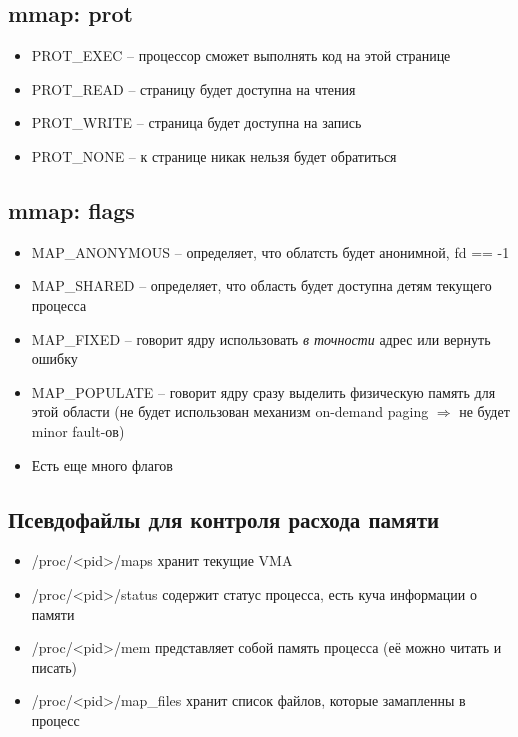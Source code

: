     \subsection{mmap: prot}
      \begin{itemize}
        \item PROT\_EXEC -- процессор сможет выполнять код на этой странице
        \item PROT\_READ -- страницу будет доступна на чтения
        \item PROT\_WRITE -- страница будет доступна на запись
        \item PROT\_NONE -- к странице никак нельзя будет обратиться
      \end{itemize}
    
    \subsection{mmap: flags}
      \begin{itemize}
        \item MAP\_ANONYMOUS -- определяет, что облатсть будет анонимной, fd == -1
        \item MAP\_SHARED -- определяет, что область будет доступна детям текущего процесса
        \item MAP\_FIXED -- говорит ядру использовать \textit{в точности} адрес  или вернуть ошибку
        \item MAP\_POPULATE -- говорит ядру сразу выделить физическую память для этой области (не будет использован механизм on-demand paging $\Rightarrow$ не будет minor fault-ов)
        \item Есть еще много флагов
      \end{itemize}
    
    \subsection{Псевдофайлы для контроля расхода памяти}
      \begin{itemize}
        \item /proc/<pid>/maps хранит текущие VMA
        \item /proc/<pid>/status содержит статус процесса, есть куча информации о памяти
        \item /proc/<pid>/mem представляет собой память процесса (её можно читать и писать)
        \item /proc/<pid>/map\_files хранит список файлов, которые замапленны в процесс
      \end{itemize}
    
